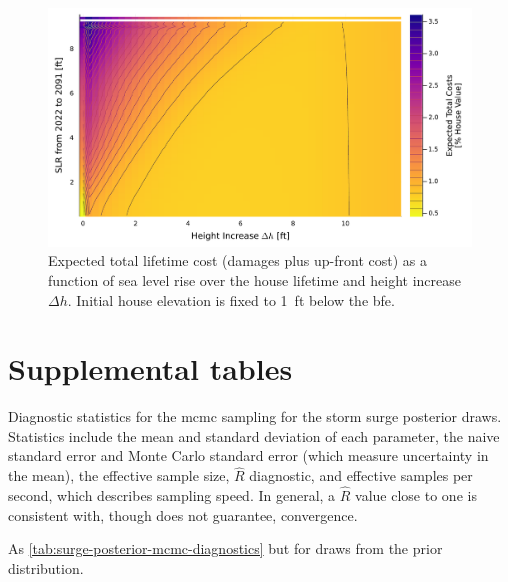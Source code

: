 \documentclass[12pt]{article}
\begin{document}
\begin{figure}
    \includegraphics[width=\textwidth]{scenario-map-height-slr}
    \caption{
        Expected total lifetime cost (damages plus up-front cost) as a function of sea level rise over the house lifetime and height increase $\Delta h$.
        Initial house elevation is fixed to \SI{1}{ft} below the \gls{bfe}.
    }\label{fig:scenario-map-height-slr}
\end{figure}

\section{Supplemental tables}

\begin{table}[h]
    \centering
    \caption{
        Diagnostic statistics for the \gls{mcmc} sampling for the storm surge posterior draws.
        Statistics include the mean and standard deviation of each parameter, the naive standard error and Monte Carlo standard error (which measure uncertainty in the mean), the effective sample size, $\hat{R}$ diagnostic, and effective samples per second, which describes sampling speed.
        In general, a $\hat{R}$ value close to one is consistent with, though does not guarantee, convergence.
    }\label{tab:surge-posterior-mcmc-diagnostics}
\end{table}

\begin{table}[h]
    \centering
    \caption{As \cref{tab:surge-posterior-mcmc-diagnostics} but for draws from the prior distribution.}\label{tab:surge-prior-mcmc-diagnostics}
\end{table}
\end{document}
